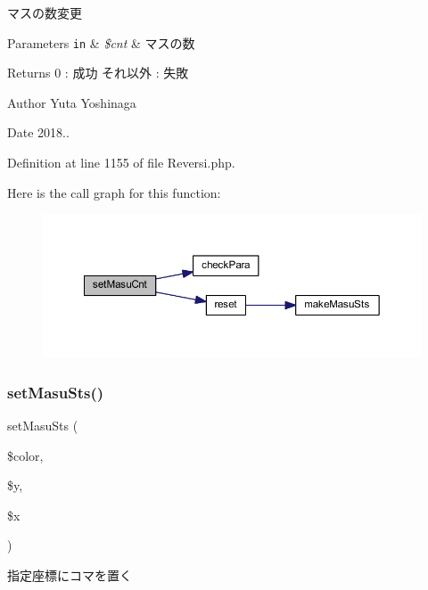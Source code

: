マスの数変更 


\begin{DoxyParams}[1]{Parameters}
\mbox{\tt in}  & {\em \$cnt} & マスの数 \\
\hline
\end{DoxyParams}
\begin{DoxyReturn}{Returns}
0 \+: 成功 それ以外 \+: 失敗 
\end{DoxyReturn}
\begin{DoxyAuthor}{Author}
Yuta Yoshinaga 
\end{DoxyAuthor}
\begin{DoxyDate}{Date}
2018.. 
\end{DoxyDate}


Definition at line 1155 of file Reversi.\+php.

Here is the call graph for this function\+:\nopagebreak
\begin{figure}[H]
\begin{center}
\leavevmode
\includegraphics[width=350pt]{class_reversi_ab6853cc0f53e50a70d576f15296f0864_cgraph}
\end{center}
\end{figure}
\mbox{\label{class_reversi_a26f3168c7d94e70d344841d65885a4ac}} 
\subsubsection{\texorpdfstring{set\+Masu\+Sts()}{setMasuSts()}}
{\footnotesize\ttfamily set\+Masu\+Sts (\begin{DoxyParamCaption}\item[{}]{\$color,  }\item[{}]{\$y,  }\item[{}]{\$x }\end{DoxyParamCaption})}



指定座標にコマを置く 


